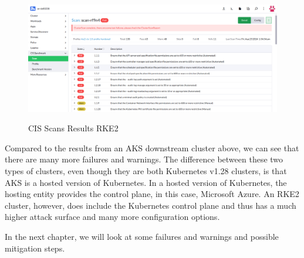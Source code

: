 \begin{figure}[H]
\centering
\caption {CIS Scans Results RKE2}
\includegraphics[width=\linewidth]{images/cis-scans-3.png}
\label{fig:cisRKE2}
\end{figure}

Compared to the results from an AKS downstream cluster above, we can see that there are many more failures and warnings. The difference between these two types of clusters, even though they are both Kubernetes v1.28 clusters, is that AKS is a hosted version of Kubernetes. In a hosted version of Kubernetes, the hosting entity provides the control plane, in this case, Microsoft Azure. An RKE2 cluster, however, does include the Kubernetes control plane and thus has a much higher attack surface and many more configuration options.

In the next chapter, we will look at some failures and warnings and possible mitigation steps.
